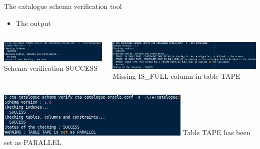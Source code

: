 \documentclass[aspectratio=149]{beamer}
\begin{document}
\begin{frame}{The catalogue schema verification tool}
  \begin{itemize}
    \item The output
  \end{itemize}
  \begin{columns}
    \begin{column}{0.5\textwidth}
	  \includegraphics[keepaspectratio, height=1\textheight, width=1\textwidth]{SchemaVerifySuccess.png}
      \small{Schema verification SUCCESS}
    \end{column}
    \begin{column}{0.5\textwidth}
	  \includegraphics[keepaspectratio, height=1\textheight, width=1\textwidth]{SchemaVerifyRemovedColumn.png}
	  \small{Missing IS\_FULL column in table TAPE}
    \end{column}
  \end{columns}
  \begin{center}
	 \includegraphics[keepaspectratio, height=0.7\textheight, width=0.7\textwidth]{ParallelTable.png}
	 \newline
	 \small{Table TAPE has been set as PARALLEL}
  \end{center}
\end{frame}
\end{document}
